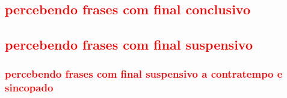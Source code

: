 \subsection{\textcolor{red}{percebendo frases com final conclusivo}}

\subsection{\textcolor{red}{percebendo frases com final suspensivo}}


\subsubsection{\textcolor{red}{percebendo frases com final suspensivo a contratempo e sincopado}}


